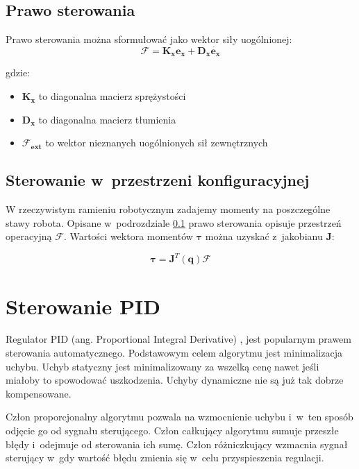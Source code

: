 \subsection{Prawo sterowania}
\label{sec:impedancyjne}

Prawo sterowania można sformułować  jako wektor siły uogólnionej:
\begin{equation}
\boldsymbol{\mathcal{F}} = \boldsymbol{K_x}\boldsymbol{e_x} + \boldsymbol{D_x}\dot{\boldsymbol{e_x}}
\end{equation}

gdzie:
\begin{itemize}
\item $\boldsymbol{K_x}$ to diagonalna macierz sprężystości
\item $\boldsymbol{D_x}$ to diagonalna macierz tłumienia
\item $\boldsymbol{\mathcal{F}_{ext}}$ to wektor nieznanych uogólnionych sił zewnętrznych
\end{itemize}

\subsection{Sterowanie w~przestrzeni konfiguracyjnej}
\label{chap:jakobian}
W rzeczywistym ramieniu robotycznym zadajemy momenty na poszczególne stawy robota. Opisane w~podrozdziale \ref{sec:impedancyjne} prawo sterowania opisuje przestrzeń operacyjną $\boldsymbol{\mathcal{F}}$.  Wartości wektora momentów $\boldsymbol{\tau}$ można uzyskać z~jakobianu $\boldsymbol{J}$:

\begin{equation}
\boldsymbol{\tau} = \boldsymbol{J}^T(\boldsymbol{q})\boldsymbol{\mathcal{F}}
\end{equation}

\section{Sterowanie PID}
\label{chap:key}
Regulator PID (ang. Proportional Integral Derivative) \cite{bib:pidTito}, \cite{bib:pidMimo} jest popularnym prawem sterowania automatycznego. Podstawowym celem algorytmu jest minimalizacja uchybu. Uchyb statyczny jest minimalizowany za wszelką cenę nawet jeśli miałoby to spowodować uszkodzenia. Uchyby dynamiczne nie są już tak dobrze kompensowane.

Człon proporcjonalny algorytmu pozwala na wzmocnienie uchybu i~w~ten sposób odjęcie go od sygnału sterującego. Człon całkujący algorytmu sumuje przeszłe błędy i~odejmuje od sterowania ich sumę. Człon różniczkujący wzmacnia sygnał sterujący w~gdy wartość błędu zmienia się w~celu przyspieszenia regulacji.
